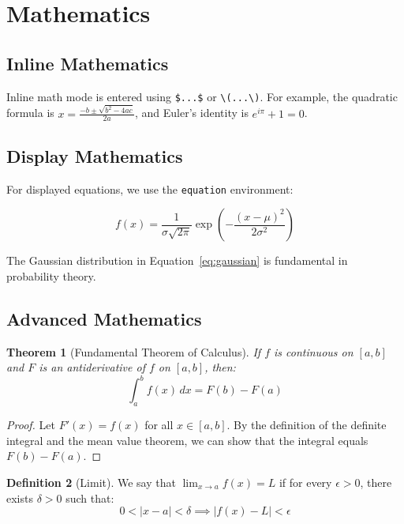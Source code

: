 \documentclass[12pt,a4paper]{article}
\newtheorem{theorem}{Theorem}[section]
\theoremstyle{definition}
\newtheorem{definition}[theorem]{Definition}
\theoremstyle{remark}
\begin{document}
\section{Mathematics}
\label{sec:math}

\subsection{Inline Mathematics}

Inline math mode is entered using \verb|$...$| or \verb|\(...\)|. For example, the quadratic formula is $x = \frac{-b \pm \sqrt{b^2 - 4ac}}{2a}$, and Euler's identity is $e^{i\pi} + 1 = 0$.

\subsection{Display Mathematics}

For displayed equations, we use the \texttt{equation} environment:

\begin{equation}
    \label{eq:gaussian}
    f(x) = \frac{1}{\sigma\sqrt{2\pi}} \exp\left(-\frac{(x-\mu)^2}{2\sigma^2}\right)
\end{equation}

The Gaussian distribution in Equation~\eqref{eq:gaussian} is fundamental in probability theory.

\subsection{Advanced Mathematics}

\begin{theorem}[Fundamental Theorem of Calculus]
\label{thm:ftc}
If $f$ is continuous on $[a,b]$ and $F$ is an antiderivative of $f$ on $[a,b]$, then:
\[
    \int_a^b f(x)\,dx = F(b) - F(a)
\]
\end{theorem}

\begin{proof}
Let $F'(x) = f(x)$ for all $x \in [a,b]$. By the definition of the definite integral and the mean value theorem, we can show that the integral equals $F(b) - F(a)$.
\end{proof}

\begin{definition}[Limit]
We say that $\lim_{x \to a} f(x) = L$ if for every $\epsilon > 0$, there exists $\delta > 0$ such that:
\[
    0 < |x - a| < \delta \implies |f(x) - L| < \epsilon
\]
\end{definition}
\end{document}
